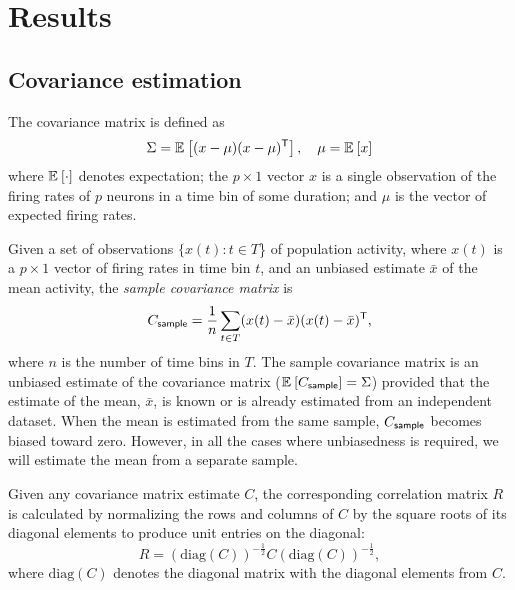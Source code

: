 \section*{Results}
\subsection*{Covariance estimation}
The covariance matrix is defined as
\begin{equation}\label{eq:true-covariance}
    \Sigma = \mathbb E_{}\left[ (x-\mu)(x-\mu)^{\sf T}\right],\quad \mu = \mathbb E_{}\left[ x\right]
    \end{equation}
    where $\mathbb E_{}\left[ \cdot\right]$ denotes expectation; the $p\times 1$ vector $x$ is a single observation of the firing rates of $p$ neurons in a time bin of some duration; and $\mu$ is the vector of expected firing rates. 

Given a set of observations $\{x(t): t\in T$\} of population activity, where $x(t)$ is a $p\times 1$ vector of firing rates in time bin $t$, and an unbiased estimate $\bar x$ of the mean activity, the \emph{sample covariance matrix} is
\begin{equation}\label{eq:sample}
    C_{\sf sample} = \frac 1 n \sum\limits_{t\in T} (x(t)-\bar x)(x(t)-\bar x)^{\sf T},
    \end{equation}
where $n$ is the number of time bins in $T$. 
The sample covariance matrix is an unbiased estimate of the covariance matrix ($\mathbb E_{}\left[ C_{\sf sample}\right]=\Sigma$) provided that the estimate of the mean, $\bar x$, is known or is already estimated from an independent dataset. 
When the mean is estimated from the same sample, $C_{\sf sample}$ becomes biased toward zero.  However, in all the cases where unbiasedness is required, we will estimate the mean from a separate sample.

Given any covariance matrix estimate $C$, the corresponding correlation matrix $R$ is calculated by normalizing the rows and columns of $C$ by the square roots of its diagonal elements to produce unit entries on the diagonal:
\begin{equation}\label{eq:precision}
    R = (\mbox{diag}(C))^{-\frac 1 2} C (\mbox{diag}(C))^{-\frac 1 2},
\end{equation}
where $\mbox{diag}(C)$ denotes the diagonal matrix with the diagonal elements from $C$.

